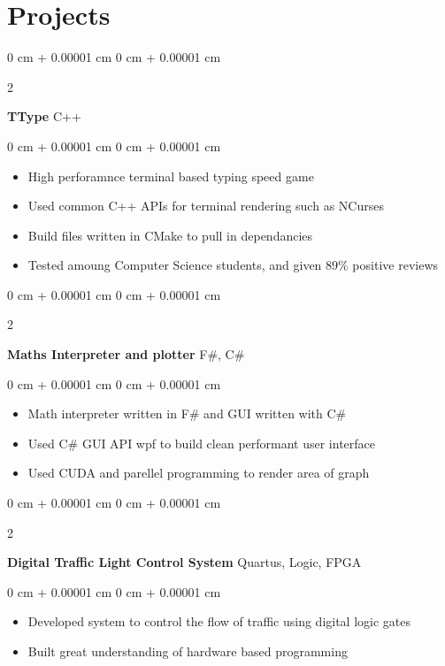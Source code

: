 \documentclass[10pt, letterpaper]{article}
\newenvironment{highlights}{
    \begin{itemize}[
        topsep=0.10 cm,
        parsep=0.10 cm,
        partopsep=0pt,
        itemsep=0pt,
        leftmargin=0 cm + 10pt
    ]
}{
    \end{itemize}
} %
\newenvironment{onecolentry}{
    \begin{adjustwidth}{
        0 cm + 0.00001 cm
    }{
        0 cm + 0.00001 cm
    }
}{
    \end{adjustwidth}
} %
\newenvironment{twocolentry}[2][]{
    \onecolentry
    \def\secondColumn{#2}
    \setcolumnwidth{\fill, 4.5 cm}
    \begin{paracol}{2}
}{
    \switchcolumn \raggedleft \secondColumn
    \end{paracol}
    \endonecolentry
} %
\begin{document}
    \section{Projects}

    \begin{twocolentry}{
        C++
    }
        \textbf{TType}\end{twocolentry}
    \vspace{0.10 cm}
    \begin{onecolentry}
        \begin{highlights}
            \item High perforamnce terminal based typing speed game
            \item Used common C++ APIs for terminal rendering such as NCurses
            \item Build files written in CMake to pull in dependancies
            \item Tested amoung Computer Science students, and given 89\% positive reviews
        \end{highlights}
    \end{onecolentry}
    \vspace{0.2 cm}
    \begin{twocolentry}{
        F\#, C\#
    }
        \textbf{Maths Interpreter and plotter}\end{twocolentry}
    \vspace{0.10 cm}
    \begin{onecolentry}
        \begin{highlights}
            \item Math interpreter written in F\# and GUI written with C\#
            \item Used C\# GUI API wpf to build clean performant user interface
            \item Used CUDA and parellel programming to render area of graph
        \end{highlights}
    \end{onecolentry}

    \vspace{0.2 cm}

    \begin{twocolentry}{
        Quartus, Logic, FPGA
    }
        \textbf{Digital Traffic Light Control System}\end{twocolentry}
    \vspace{0.10 cm}
    \begin{onecolentry}
        \begin{highlights}
            \item Developed system to control the flow of traffic using digital logic gates
            \item Built great understanding of hardware based programming
        \end{highlights}
    \end{onecolentry}
\end{document}
